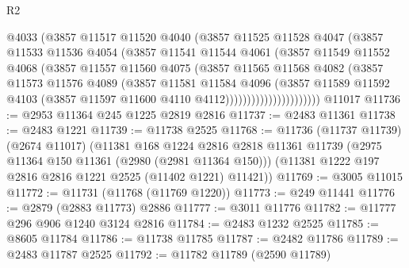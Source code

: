 \begin{lexlean}{R2}
\begin{coremodule}
                          @4033
                          (@3857
                            @11517
                            @11520
                            @4040
                            (@3857
                              @11525
                              @11528
                              @4047
                              (@3857
                                @11533
                                @11536
                                @4054
                                (@3857
                                  @11541
                                  @11544
                                  @4061
                                  (@3857
                                    @11549
                                    @11552
                                    @4068
                                    (@3857
                                      @11557
                                      @11560
                                      @4075
                                      (@3857
                                        @11565
                                        @11568
                                        @4082
                                        (@3857
                                          @11573
                                          @11576
                                          @4089
                                          (@3857
                                            @11581
                                            @11584
                                            @4096
                                            (@3857
                                              @11589
                                              @11592
                                              @4103
                                              (@3857 @11597 @11600 @4110 @4112))))))))))))))))))))))
    @11017
@11736 := @2953 @11364 @245 @1225 @2819 @2816
@11737 := @2483 @11361
@11738 := @2483 @1221
@11739 := @11738 @2525
@11768 := @11736
    (@11737 @11739)
    (@2674 @11017)
    (@11381
      @168
      @1224
      @2816
      @2818
      @11361
      @11739
      (@2975 @11364 @150 @11361 (@2980 (@2981 @11364 @150)))
      (@11381 @1222 @197 @2816 @2816 @1221 @2525 (@11402 @1221) @11421))
@11769 := @3005 @11015
@11772 := @11731 (@11768 (@11769 @1220))
@11773 := @249 @11441
@11776 := @2879 (@2883 @11773) @2886
@11777 := @3011 @11776
@11782 := @11777 @296 @906 @1240 @3124 @2816
@11784 := @2483 @1232 @2525
@11785 := @8605 @11784
@11786 := @11738 @11785
@11787 := @2482 @11786
@11789 := @2483 @11787 @2525
@11792 := @11782 @11789 (@2590 @11789)

\end{coremodule}
\end{lexlean}
